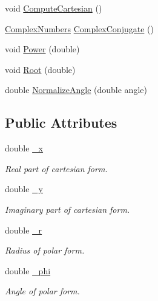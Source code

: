 \begin{DoxyCompactItemize}
\item 
void \hyperlink{class_complex_numbers_aaf5da3b3d268e59f2139a32518cd029a}{Compute\-Cartesian} ()
\item 
\hyperlink{class_complex_numbers}{Complex\-Numbers} \hyperlink{class_complex_numbers_a67784bfb7c45f55f876dd2cb724d8f64}{Complex\-Conjugate} ()
\item 
void \hyperlink{class_complex_numbers_aeb1ef4510972979b6b5095033c59325f}{Power} (double)
\item 
void \hyperlink{class_complex_numbers_ad28dccab27914091a8a4d8e8e0719b54}{Root} (double)
\item 
double \hyperlink{class_complex_numbers_a79815603bc8600d82cfb0116d54eed0c}{Normalize\-Angle} (double angle)
\end{DoxyCompactItemize}
\subsection*{Public Attributes}
\begin{DoxyCompactItemize}
\item 
double \hyperlink{class_complex_numbers_aa8b389301876673ec9bd8d2ad28c5a7f}{\-\_\-x}
\begin{DoxyCompactList}\small\item\em Real part of cartesian form. \end{DoxyCompactList}\item 
double \hyperlink{class_complex_numbers_aa11ffc8edeb15cbc67bc89edc9ed137d}{\-\_\-y}
\begin{DoxyCompactList}\small\item\em Imaginary part of cartesian form. \end{DoxyCompactList}\item 
double \hyperlink{class_complex_numbers_a6b9cd38ec145deff3e5577e2361b189d}{\-\_\-r}
\begin{DoxyCompactList}\small\item\em Radius of polar form. \end{DoxyCompactList}\item 
double \hyperlink{class_complex_numbers_a1fcf58ebb224357057a2c7d4701e372c}{\-\_\-phi}
\begin{DoxyCompactList}\small\item\em Angle of polar form. \end{DoxyCompactList}\end{DoxyCompactItemize}


